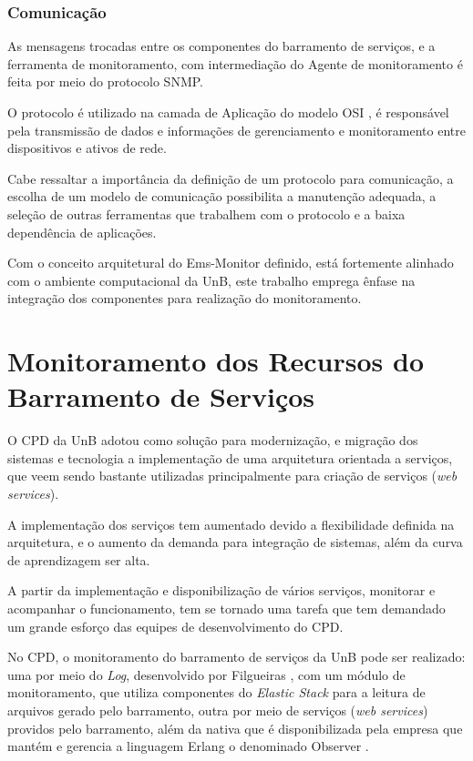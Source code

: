 \subsubsection{Comunicação}

As mensagens trocadas entre os componentes do barramento de serviços, e a ferramenta de monitoramento, com intermediação do Agente de monitoramento é feita por meio do protocolo \acrshort{SNMP}. 

O protocolo é utilizado na camada de Aplicação do modelo OSI \cite{tanenbaum2003redes}, é responsável pela transmissão de dados e informações de gerenciamento e monitoramento entre dispositivos e ativos de rede. 

Cabe ressaltar a importância da definição de um protocolo para comunicação, a escolha de um modelo de comunicação possibilita a manutenção adequada, a seleção de outras ferramentas que trabalhem com o protocolo e a baixa dependência de aplicações.     

Com o conceito arquitetural do Ems-Monitor definido, está fortemente alinhado com o ambiente computacional da \acrshort{UnB}, este trabalho emprega ênfase na integração dos componentes para realização do monitoramento.   

\section{Monitoramento dos Recursos do Barramento de Serviços}%
\label{recursos_monitoramento}

O \acrshort{CPD} da \acrshort{UnB} adotou como solução para modernização, e migração dos sistemas e tecnologia a implementação de uma arquitetura orientada a serviços, que veem sendo bastante utilizadas principalmente para criação de serviços (\textit{web services}). 

A implementação dos serviços tem aumentado devido a flexibilidade definida na arquitetura, e o aumento da demanda para integração de sistemas, além da curva de aprendizagem ser alta. 

A partir da implementação e disponibilização de  vários serviços, monitorar e acompanhar o funcionamento, tem se tornado uma tarefa que tem demandado um grande esforço das equipes de desenvolvimento do \acrshort{CPD}. 

No \acrshort{CPD}, o monitoramento do barramento de serviços da \acrshort{UnB} pode ser realizado: uma por meio do \textit{Log}, desenvolvido por Filgueiras \cite{filgueirasmonitoramento}, com um módulo de monitoramento, que utiliza componentes do \textit{Elastic Stack} para a leitura de arquivos gerado pelo barramento, outra por meio de serviços (\textit{web services}) providos pelo barramento, além da nativa que é disponibilizada pela empresa que mantém e gerencia a linguagem Erlang o denominado Observer \cite{ericssonAB2002-2019}.

